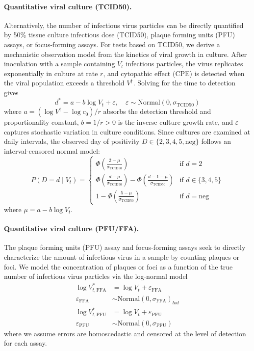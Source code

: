\documentclass[12pt]{article}
\begin{document}
\paragraph{Quantitative viral culture (TCID50).} Alternatively, the number of infectious virus particles can be directly quantified by 50\% tissue culture infectious dose (TCID50), plaque forming units (PFU) assays, or focus-forming assays. For tests based on TCID50, we derive a mechanistic observation model from the kinetics of viral growth in culture. After inoculation with a sample containing $V_t$ infectious particles, the virus replicates exponentially in culture at rate $r$, and cytopathic effect (CPE) is detected when the viral population exceeds a threshold $V^{\dagger}$. Solving for the time to detection gives
\begin{equation*}
    d^{*} = a - b \log V_t + \varepsilon, \quad \varepsilon \sim \text{Normal}(0, \sigma_{\text{TCID50}})
\end{equation*}
where $a = (\log V^{\dagger} - \log c_0)/r$ absorbs the detection threshold and proportionality constant, $b = 1/r > 0$ is the inverse culture growth rate, and $\varepsilon$ captures stochastic variation in culture conditions. Since cultures are examined at daily intervals, the observed day of positivity $D \in \{2, 3, 4, 5, \text{neg}\}$ follows an interval-censored normal model:
\begin{equation*}
    P(D = d \mid V_t) = \begin{cases}
        \Phi\!\left(\frac{2 - \mu}{\sigma_{\text{TCID50}}}\right) & \text{if } d = 2 \\[4pt]
        \Phi\!\left(\frac{d - \mu}{\sigma_{\text{TCID50}}}\right) - \Phi\!\left(\frac{d - 1 - \mu}{\sigma_{\text{TCID50}}}\right) & \text{if } d \in \{3, 4, 5\} \\[4pt]
        1 - \Phi\!\left(\frac{5 - \mu}{\sigma_{\text{TCID50}}}\right) & \text{if } d = \text{neg}
    \end{cases}
\end{equation*}
where $\mu = a - b \log V_t$.

\paragraph{Quantitative viral culture (PFU/FFA).} The plaque forming units (PFU) assay and focus-forming assays seek to directly characterize the amount of infectious virus in a sample by counting plaques or foci. We model the concentration of plaques or foci as a function of the true number of infectious virus particles via the log-normal model
\begin{align*}
    \log V^{*}_{t,\text{FFA}} &= \log V_t + \varepsilon_{\text{FFA}} \\
    \varepsilon_{\text{FFA}} &\sim \text{Normal}(0, \sigma_{\text{FFA}})_{lod} \\
    \log V^{*}_{t,\text{PFU}} &= \log V_t + \varepsilon_{\text{PFU}} \\
    \varepsilon_{\text{PFU}} &\sim \text{Normal}(0, \sigma_{\text{PFU}})
\end{align*}
where we assume errors are homoscedastic and censored at the level of detection for each assay.
\end{document}
